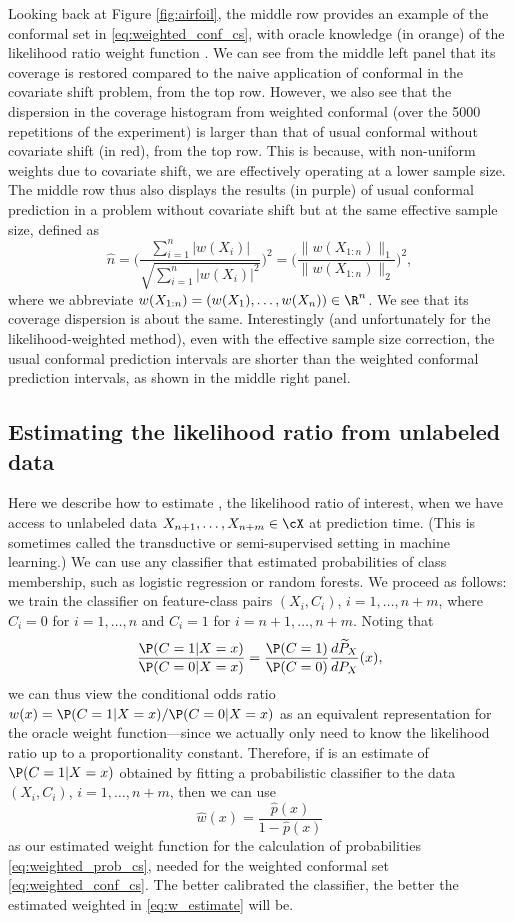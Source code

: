 \documentclass{article}
\begin{document}
Looking back at Figure \ref{fig:airfoil}, the middle row provides an example of
the conformal set in \eqref{eq:weighted_conf_cs}, with oracle knowledge (in
orange) of the likelihood ratio weight function
. We can see from the middle left panel that  
its coverage is restored compared to the naive application of conformal in the
covariate shift problem, from the top row. However, we also see that the
dispersion in the coverage histogram from weighted conformal (over the 5000
repetitions of the experiment) is larger than that of usual conformal without
covariate shift (in red), from the top row. This is because, with non-uniform
weights due to covariate shift, we are effectively operating at a lower
sample size. The middle row thus also displays the results (in purple) of usual
conformal prediction in a problem without covariate shift but at the same
effective sample size, defined as   
\[
\hat{n} = \bigg( \frac{\sum_{i=1}^n |w(X_i)|}{\sqrt{\sum_{i=1}^n |w(X_i)|^2}}
\bigg)^2 = \bigg( \frac{\|w(X_{1:n})\|_1}{\|w(X_{1:n})\|_2} \bigg)^2,
\]
where we abbreviate $w(X_{1:n})=(w(X_1),\ldots,w(X_n)) \in \R^n$. We see that
its coverage dispersion is about the same. Interestingly (and unfortunately for
the likelihood-weighted method), even with the effective sample size correction, 
the usual conformal prediction intervals are shorter than the weighted conformal
prediction intervals, as shown in the middle right panel.

\subsection{Estimating the likelihood ratio from unlabeled data}

Here we describe how to estimate , the  
likelihood ratio of interest, when we have access to unlabeled data
$X_{n+1},\dots,X_{n+m} \in \cX$ at prediction time. (This is sometimes called the
transductive or semi-supervised setting in machine learning.) We can use any
classifier that estimated probabilities of class membership, such as logistic
regression or random forests. We proceed as follows: we train the classifier on
feature-class pairs $(X_i,C_i)$, $i=1,\ldots,n+m$,  where $C_i=0$ for
$i=1,\ldots,n$ and $C_i=1$ for $i=n+1,\ldots,n+m$. Noting that  
\[
\frac{\P(C=1 | X=x)}{\P(C=0 | X=x)}
= \frac{\P(C=1)}{\P(C=0)} \frac{d\widetilde{P}_X}{dP_X}(x),
\]
we can thus view the conditional odds ratio $w(x)=\P(C=1|X=x)/\P(C=0|X=x)$ as an
equivalent representation for the oracle weight function---since we actually
only need to know the likelihood ratio up to a proportionality 
constant. Therefore, if  is an estimate of $\P(C=1|X=x)$
obtained by fitting a probabilistic classifier to the data $(X_i,C_i)$,
$i=1,\ldots,n+m$, then we can use   
\begin{equation}
\label{eq:w_estimate}
\hat{w}(x) = \frac{\hat{p}(x)}{1-\hat{p}(x)}
\end{equation}
as our estimated weight function for the calculation of probabilities
\eqref{eq:weighted_prob_cs}, needed for the weighted conformal set
\eqref{eq:weighted_conf_cs}. The better calibrated the classifier, the better
the estimated weighted in \eqref{eq:w_estimate} will be. 
\end{document}
